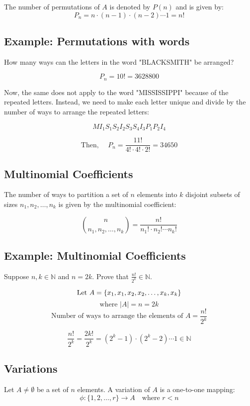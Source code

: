 \documentclass[11pt]{article}
\begin{document}
The number of permutations of $A$ is denoted by $P(n)$ and is given by:
\[  
P_n = n \cdot ( n - 1 ) \cdot (n - 2) \cdots 1 = n!
\]

\subsection*{Example: Permutations with words}
How many ways can the letters in the word "BLACKSMITH" be arranged?

\[
P_n = 10! = 3628800
\]

Now, the same does not apply to the word "MISSISSIPPI" because of the repeated letters.
Instead, we need to make each letter unique and divide by the number of ways to arrange the repeated letters:

\[
MI_1S_1S_2I_2S_3S_4I_3P_1P_2I_4
\]

\[
\text{Then, } \quad P_n = \frac{11!}{4! \cdot 4! \cdot 2!} = 34650
\]

\subsection{Multinomial Coefficients}
The number of ways to partition a set of $n$ elements into $k$ disjoint subsets of sizes $n_1, n_2, \dots, n_k$ is given by the multinomial coefficient:

\[
\binom{n}{n_1, n_2, \dots, n_k} = \frac{n!}{n_1! \cdot n_2! \cdots n_k!}
\]

\subsection*{Example: Multinomial Coefficients}
Suppose $n, k \in \mathbb{N}$ and $n = 2k$. Prove that $\frac{n!}{2^k} \in \mathbb{N}$.

\[
\text{Let } A = \{x_1, x_1, x_2, x_2, \dots, x_k, x_k\} \\
\]
\[
\text{where } |A| = n = 2k 
\]
\[
\text{Number of ways to arrange the elements of } A = \frac{n!}{2^k}
\]

\[
\frac{n!}{2^k} = \frac{2k!}{2^k} = (2^k - 1) \cdot (2^k - 2) \cdots 1 \in \mathbb{N}
\]

\subsection{Variations}
Let $A \neq \emptyset$ be a set of $n$ elements. A variation of $A$ is a one-to-one mapping:
\[
\phi: \{1,2,\dots ,r\} \rightarrow A \quad \text{where } r < n
\]
\end{document}
